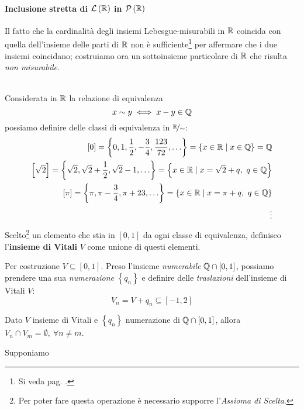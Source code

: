 \paragraph{Inclusione stretta di {$\mathcal{L}\left(\mathbb{R}\right)$} in  {$\mathcal{P}\left(\mathbb{R}\right)$}}
Il fatto che la cardinalità degli insiemi Lebesgue-misurabili in $\mathbb{R}$ coincida con quella dell'insieme delle parti di $\mathbb{R}$ non è sufficiente\footnote{Si veda pag. \pageref{cardinalitàugualenonimplicauguaglianzainsiemistica}.} per affermare che i due insiemi coincidano; costruiamo ora un sottoinsieme particolare di $\mathbb{R}$ che risulta \textit{non misurabile}.\\
\begin{define}~{}\\
	Considerata in $\mathbb{R}$ la relazione di equivalenza
	\begin{equation}
		x\sim y\iff x-y\in\mathbb{Q}
	\end{equation}
	possiamo definire delle classi di equivalenza in $\nicefrac{\mathbb{R}}{\sim}$:
	\begin{align*}
		\left[0\right]=\left\{0,1,\frac{1}{2},-\frac{3}{4},\frac{123}{72},\ldots\right\}=\left\{x\in\mathbb{R}\mid x\in\mathbb{Q}\right\}=\mathbb{Q}\\
		\left[\sqrt{2}\right]=\left\{\sqrt{2},\sqrt{2}+\frac{1}{2},\sqrt{2}-1,\ldots\right\}=\left\{x\in\mathbb{R}\mid x=\sqrt{2}+q,\ q\in\mathbb{Q}\right\}\\
		\left[\pi\right]=\left\{\pi,\pi-\frac{3}{4},\pi+23,\ldots\right\}=\left\{x\in\mathbb{R}\mid x=\pi+q,\ q\in\mathbb{Q}\right\}\\
		\vdots
	\end{align*}
	Scelto\footnote{Per poter fare questa operazione è necessario supporre l'\textit{Assioma di Scelta}.} un elemento che stia in $\left[0,1\right]$ da ogni classe di equivalenza, definisco l'\textbf{insieme di Vitali} $V$ come unione di questi elementi.
\end{define}
Per costruzione $V\subseteq\left[0,1\right]$. Preso l'insieme \textit{numerabile} $\mathbb{Q}\cap\left[0,1\right]$, possiamo prendere una sua \textit{numerazione} $\left\{q_n\right\}$ e definire delle \textit{traslazioni} dell'insieme di Vitali $V$:
\begin{equation*}
	V_n=V+q_n\subseteq\left[-1,2\right]
\end{equation*}
\begin{lemming}
	Dato $V$ insieme di Vitali e $\left\{q_n\right\}$ numerazione di $\mathbb{Q}\cap\left[0,1\right]$, allora $V_n\cap V_m=\emptyset,\ \forall n\neq m$.
\end{lemming}
\begin{demonstration}
	Supponiamo
\end{demonstration}